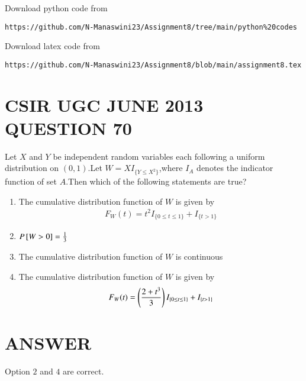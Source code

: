 \documentclass[journal,12pt,twocolumn]{IEEEtran}
\begin{document}
\renewcommand{\thefigure}{\theenumi}
\renewcommand{\thetable}{\theenumi}
Download python code from 
\begin{lstlisting}
https://github.com/N-Manaswini23/Assignment8/tree/main/python%20codes
\end{lstlisting}
%
Download latex code from 
\begin{lstlisting}
https://github.com/N-Manaswini23/Assignment8/blob/main/assignment8.tex
\end{lstlisting}
%

\section*{CSIR UGC JUNE 2013 QUESTION 70}
Let $X$ and $Y$ be independent random variables each following a uniform distribution on $(0,1)$.Let $W=XI_{\{Y\leq X^2\}}$,where $I_A$ denotes the indicator function of set $A$.Then which of the following statements are true? \\
\begin{enumerate}
\item The cumulative distribution function of $W$ is given by
\begin{align}
  F_W(t)=t^2I_{\{0\leq t \leq 1\}}+ I_{\{t > 1\}}
\end{align}
\item $P{}\left[W>0\right]=\frac{1}{3}$
\item The cumulative distribution function of $W$ is continuous
\item The cumulative distribution function of $W$ is given by
\begin{align}
  F_W(t)=\left(\frac{2+t^3}{3}\right)I_{\{0\leq t \leq 1\}}+ I_{\{t > 1\}}
\end{align}
\end{enumerate}

\section*{ANSWER}
Option $2$ and $4$ are correct.
\end{document}
